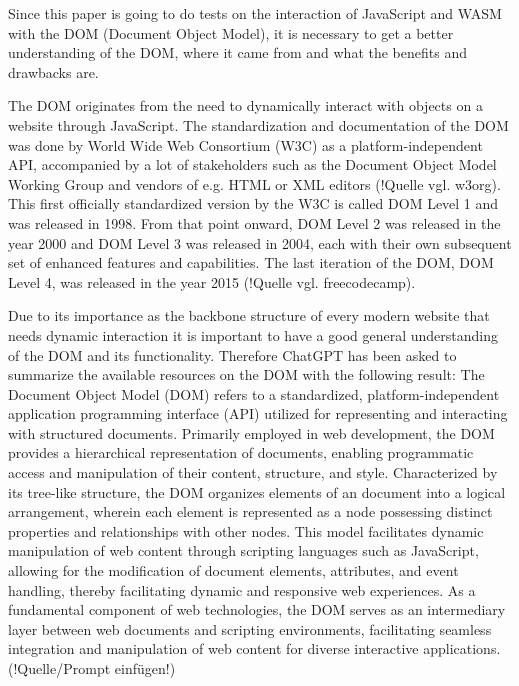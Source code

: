 Since this paper is going to do tests on the interaction of JavaScript and WASM with the DOM (Document Object Model), it is necessary to get a better understanding of the DOM, where it came from and what the benefits and drawbacks are.

The DOM originates from the need to dynamically interact with objects on a website through JavaScript. The standardization and documentation of the DOM was done by World Wide Web Consortium (W3C) as a platform-independent API, accompanied by a lot of stakeholders such as the Document Object Model Working Group and vendors of e.g. HTML or XML editors (!Quelle vgl. w3org). This first officially standardized version by the W3C is called DOM Level 1 and was released in 1998. From that point onward, DOM Level 2 was released in the year 2000 and DOM Level 3 was released in 2004, each with their own subsequent set of enhanced features and capabilities. The last iteration of the DOM, DOM Level 4, was released in the year 2015 (!Quelle vgl. freecodecamp).

Due to its importance as the backbone structure of every modern website that needs dynamic interaction it is important to have a good general understanding of the DOM and its functionality. Therefore ChatGPT has been asked to summarize the available resources on the DOM with the following result: \dq
The Document Object Model (DOM) refers to a standardized, platform-independent application programming interface (API) utilized for representing and interacting with structured documents. Primarily employed in web development, the  DOM provides a hierarchical representation of documents, enabling programmatic access and manipulation of their content, structure, and style. Characterized by its tree-like structure, the DOM organizes elements of an  document into a logical arrangement, wherein each element is represented as a node possessing distinct properties and relationships with other nodes. This model facilitates dynamic manipulation of web content through scripting languages such as JavaScript, allowing for the modification of document elements, attributes, and event handling, thereby facilitating dynamic and responsive web experiences. As a fundamental component of web technologies, the  DOM serves as an intermediary layer between web documents and scripting environments, facilitating seamless integration and manipulation of web content for diverse interactive applications.\dq (!Quelle/Prompt einfügen!)

